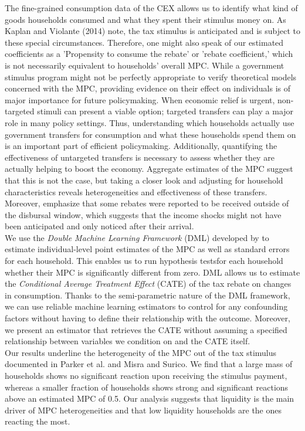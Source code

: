 The fine-grained consumption data of the CEX allows us to identify what kind of goods households consumed and what they spent their stimulus money on. As Kaplan and Violante (2014) note, the tax stimulus is anticipated and is subject to these special circumstances. Therefore, one might also speak of our estimated coefficients as a 'Propensity to consume the rebate' or 'rebate coefficient,' which is not necessarily equivalent to households' overall MPC. While a government stimulus program might not be perfectly appropriate to verify theoretical models concerned with the MPC, providing evidence on their effect on individuals is of major importance for future policymaking. When economic relief is urgent, non-targeted stimuli can present a viable option; targeted transfers can play a major role in many policy settings. Thus, understanding which households actually use government transfers for consumption and what these households spend them on is an important part of efficient policymaking. Additionally, quantifying the effectiveness of untargeted transfers is necessary to assess whether they are actually helping to boost the economy. Aggregate estimates of the MPC suggest that this is not the case, but taking a closer look and adjusting for household characteristics reveals heterogeneities and effectiveness of these transfers. Moreover, \cite{parker_etal_13} emphasize that some rebates were reported to be received outside of the disbursal window, which suggests that the income shocks might not have been anticipated and only noticed after their arrival. \\ 
We use the \textit{Double Machine Learning Framework} (DML) developed by \cite{DML2017} to estimate individual-level point estimates of the MPC as well as standard errors for each household. This enables us to run hypothesis testsfor each household whether their MPC is significantly different from zero. DML allows us to estimate the \textit{Conditional Average Treatment Effect} (CATE) of the tax rebate on changes in consumption. Thanks to the semi-parametric nature of the DML framework, we can use reliable machine learning estimators to control for any confounding factors without having to define their relationship with the outcome. Moreover, we present an estimator that retrieves the CATE without assuming a specified relationship between variables we condition on and the CATE itself. \\
Our results underline the heterogeneity of the MPC out of the tax stimulus documented in Parker et al. and Misra and Surico. We find that a large mass of households shows no significant reaction upon receiving the stimulus payment, whereas a smaller fraction of households shows strong and significant reactions above an estimated MPC of 0.5. Our analysis suggests that liquidity is the main driver of MPC heterogeneities and that low liquidity households are the ones reacting the most. \\
